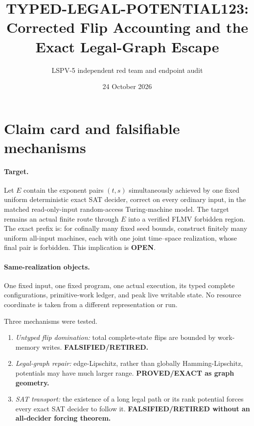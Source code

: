 \documentclass[11pt]{article}
\title{TYPED-LEGAL-POTENTIAL123:\\Corrected Flip Accounting and the Exact Legal-Graph Escape}
\author{LSPV-5 independent red team and endpoint audit}
\date{24 October 2026}
\newcommand{\OPEN}{\textbf{OPEN}}
\begin{document}
\maketitle

\begin{center}
\end{center}

\section{Claim card and falsifiable mechanisms}

\paragraph{Target.}
Let $E$ contain the exponent pairs $(t,s)$ simultaneously achieved by one
fixed uniform deterministic exact SAT decider, correct on every ordinary
input, in the matched read-only-input random-access Turing-machine model.
The target remains an actual finite route through $E$ into a verified FLMV
forbidden region.  The exact prefix is: for cofinally many fixed seed bounds,
construct finitely many uniform all-input machines, each with one joint
time--space realization, whose final pair is forbidden.  This implication is
\OPEN{}.

\paragraph{Same-realization objects.}
One fixed input, one fixed program, one actual execution, its typed complete
configurations, primitive-work ledger, and peak live writable state.  No
resource coordinate is taken from a different representation or run.

Three mechanisms were tested.
\begin{enumerate}
\item \emph{Untyped flip domination:} total complete-state flips are bounded
by work-memory writes.  \textbf{FALSIFIED/RETIRED.}
\item \emph{Legal-graph repair:} edge-Lipschitz, rather than globally
Hamming-Lipschitz, potentials may have much larger range.
\textbf{PROVED/EXACT as graph geometry.}
\item \emph{SAT transport:} the existence of a long legal path or its rank
potential forces every exact SAT decider to follow it.
\textbf{FALSIFIED/RETIRED without an all-decider forcing theorem.}
\end{enumerate}
\end{document}
